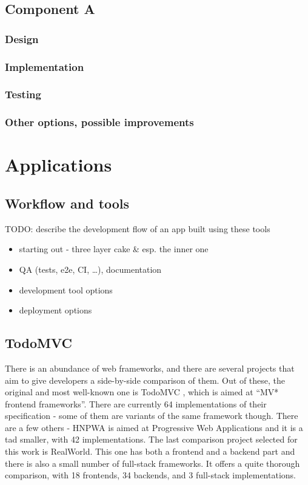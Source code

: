 \documentclass[english,odsaz]{fitthesis}
\begin{document}
\section{Component A}
\label{sec:orgc720781}
\subsection{Design}
\label{sec:orgb0ae049}
\subsection{Implementation}
\label{sec:org3efa3c4}
\subsection{Testing}
\label{sec:org72e5a8f}
\subsection{Other options, possible improvements}
\label{sec:org18a8f80}

\chapter{Applications}
\label{sec:org8b8097e}
\section{Workflow and tools}
\label{sec:org11ac03e}
TODO: describe the development flow of an app built using these tools

\begin{itemize}
\item starting out - three layer cake \& esp. the inner one
\item QA (tests, e2e, CI, \ldots{}), documentation
\item development tool options
\item deployment options
\end{itemize}

\section{TodoMVC}
\label{sec:org01ee4e9}
There is an abundance of web frameworks, and there are several projects that aim
to give developers a side-by-side comparison of them. Out of these, the original
and most well-known one is TodoMVC \cite{todomvc}, which is aimed at ``MV* frontend
frameworks''. There are currently 64 implementations of their specification -
some of them are variants of the same framework though. There are a few others -
HNPWA is aimed at Progressive Web Applications and it is a tad smaller, with 42
implementations. The last comparison project selected for this work is
RealWorld. This one has both a frontend and a backend part and there is also a
small number of full-stack frameworks. It offers a quite thorough comparison,
with 18 frontends, 34 backends, and 3 full-stack implementations.
\end{document}
